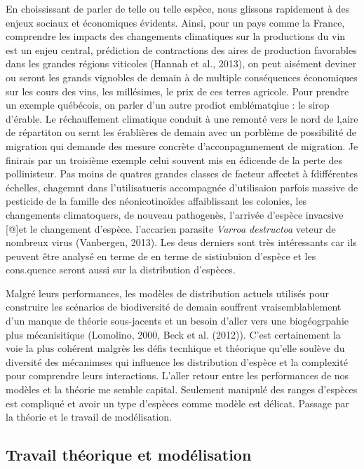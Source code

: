 En choississant de parler de telle ou telle espèce, nous glissons
rapidement à des enjeux sociaux et économiques évidents. Ainsi, pour un
pays comme la France, comprendre les impacts des changements climatiques
sur la productions du vin est un enjeu central, prédiction de
contractions des aires de production favorables dans les grandes régions
viticoles (Hannah et al., 2013), on peut aisément deviner ou seront les
grands vignobles de demain à de multiple conséquences économiques sur
les cours des vins, les millésimes, le prix de ces terres agricole. Pour
prendre un exemple québécois, on parler d'un autre prodiot emblématqiue
: le sirop d'érable. Le réchauffement climatique conduit à une remonté
vers le nord de l,aire de répartiton ou sernt les érablières de demain
avec un porblème de possibilité de migration qui demande des mesure
concrète d'acconpagnmement de migration. Je finirais par un troisième
exemple celui souvent mis en édicende de la perte des pollinisteur. Pas
moins de quatres grandes classes de facteur affectet à fdifférentes
échelles, chagemnt dans l'utilisatueris accompagnée d'utilisaion parfois
massive de pesticide de la famille des néonicotinoïdes affaiblissant les
colonies, les changements climatoquers, de nouveau pathogenès, l'arrivée
d'espèce invacsive {[}@{]}et le changement d'espèce. l'accarien parasite
\emph{Varroa destructoa} veteur de nombreux virus (Vanbergen, 2013). Les
deus derniers sont très intéressants car ils peuvent être analysé en
terme de en terme de sistiubuion d'espèce et les cons.quence seront
aussi sur la distribution d'espèces.

Malgré leurs performances, les modèles de distribution actuels utilisés
pour construire les scénarios de biodiversité de demain souffrent
vraisemblablement d'un manque de théorie sous-jacents et un besoin
d'aller vers une biogéogrpahie plus mécanisitique (Lomolino, 2000, Beck
et al. (2012)). C'est certainement la voie la plus cohérent malgrès les
défis tecnhique et théorique qu'elle soulève du diversité des mécanimses
qui influence les distribution d'espèce et la complexité pour comprendre
leurs interactions. L'aller retour entre les performances de nos modèles
et la théorie me semble capital. Seulement manipulé des ranges d'espèces
est compliqué et avoir un type d'espèces comme modèle est délicat.
Passage par la théorie et le travail de modélisation.

\subsection*{Travail théorique et
modélisation}\label{travail-thuxe9orique-et-moduxe9lisation}

